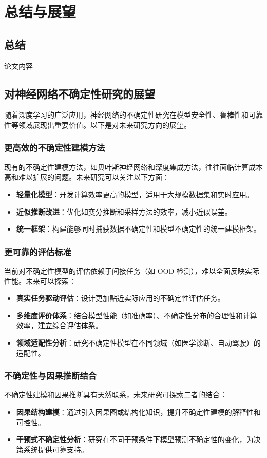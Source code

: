 \chapter{总结与展望}
\section{总结}
论文内容

\section{对神经网络不确定性研究的展望}

随着深度学习的广泛应用，神经网络的不确定性研究在模型安全性、鲁棒性和可靠性等领域展现出重要价值。以下是对未来研究方向的展望。

\subsection{更高效的不确定性建模方法}
现有的不确定性建模方法，如贝叶斯神经网络和深度集成方法，往往面临计算成本高和难以扩展的问题。未来研究可以关注以下方面：
\begin{itemize}
    \item \textbf{轻量化模型}：开发计算效率更高的模型，适用于大规模数据集和实时应用。
    \item \textbf{近似推断改进}：优化如变分推断和采样方法的效率，减小近似误差。
    \item \textbf{统一框架}：构建能够同时捕获数据不确定性和模型不确定性的统一建模框架。
\end{itemize}

\subsection{更可靠的评估标准}
当前对不确定性模型的评估依赖于间接任务（如 OOD 检测），难以全面反映实际性能。未来可以探索：
\begin{itemize}
    \item \textbf{真实任务驱动评估}：设计更加贴近实际应用的不确定性评估任务。
    \item \textbf{多维度评价体系}：结合模型性能（如准确率）、不确定性分布的合理性和计算效率，建立综合评估体系。
    \item \textbf{领域适配性分析}：研究不确定性模型在不同领域（如医学诊断、自动驾驶）的适配性。
\end{itemize}

\subsection{不确定性与因果推断结合}
不确定性建模和因果推断具有天然联系，未来研究可探索二者的结合：
\begin{itemize}
    \item \textbf{因果结构建模}：通过引入因果图或结构化知识，提升不确定性建模的解释性和可控性。
    \item \textbf{干预式不确定性分析}：研究在不同干预条件下模型预测不确定性的变化，为决策系统提供可靠支持。
\end{itemize}


